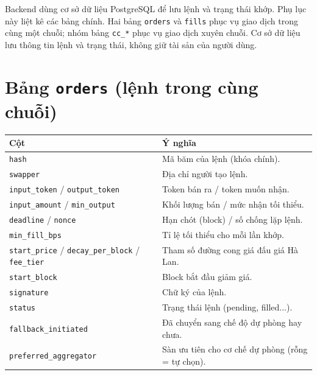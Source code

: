 \documentclass[../DoAn.tex]{subfiles}
\begin{document}
Backend dùng cơ sở dữ liệu PostgreSQL để lưu lệnh và trạng thái khớp. Phụ lục này liệt kê các bảng chính. Hai bảng \texttt{orders} và \texttt{fills} phục vụ giao dịch trong cùng một chuỗi; nhóm bảng \texttt{cc\_*} phục vụ giao dịch xuyên chuỗi. Cơ sở dữ liệu lưu thông tin lệnh và trạng thái, không giữ tài sản của người dùng.

\section{Bảng \texttt{orders} (lệnh trong cùng chuỗi)}

\begin{table}[H]
    \centering
    \begin{tabular}{|>{\raggedright\arraybackslash}p{5.5cm}|>{\raggedright\arraybackslash}p{8cm}|}
        \hline
        \textbf{Cột} & \textbf{Ý nghĩa} \\
        \hline
        \texttt{hash} & Mã băm của lệnh (khóa chính). \\
        \hline
        \texttt{swapper} & Địa chỉ người tạo lệnh. \\
        \hline
        \texttt{input\_token} / \texttt{output\_token} & Token bán ra / token muốn nhận. \\
        \hline
        \texttt{input\_amount} / \texttt{min\_output} & Khối lượng bán / mức nhận tối thiểu. \\
        \hline
        \texttt{deadline} / \texttt{nonce} & Hạn chót (block) / số chống lặp lệnh. \\
        \hline
        \texttt{min\_fill\_bps} & Tỉ lệ tối thiểu cho mỗi lần khớp. \\
        \hline
        \texttt{start\_price} / \texttt{decay\_per\_block} / \texttt{fee\_tier} & Tham số đường cong giá đấu giá Hà Lan. \\
        \hline
        \texttt{start\_block} & Block bắt đầu giảm giá. \\
        \hline
        \texttt{signature} & Chữ ký của lệnh. \\
        \hline
        \texttt{status} & Trạng thái lệnh (pending, filled...). \\
        \hline
        \texttt{fallback\_initiated} & Đã chuyển sang chế độ dự phòng hay chưa. \\
        \hline
        \texttt{preferred\_aggregator} & Sàn ưu tiên cho cơ chế dự phòng (rỗng = tự chọn). \\
        \hline
    \end{tabular}
\end{table}
\end{document}
